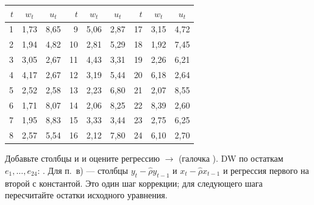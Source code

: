 \begin{center}
\small
\begin{tabular}{rcc @{\qquad} rcc @{\qquad} rcc}
\toprule
$t$ & $w_t$ & $u_t$ & $t$ & $w_t$ & $u_t$ & $t$ & $w_t$ & $u_t$ \\
\midrule
1 & 1,73 & 8,65 &  9 & 5,06 & 2,87 & 17 & 3,15 & 4,72 \\
2 & 1,94 & 4,82 & 10 & 2,81 & 5,29 & 18 & 1,92 & 7,45 \\
3 & 3,05 & 2,67 & 11 & 4,43 & 3,31 & 19 & 2,26 & 6,21 \\
4 & 4,17 & 2,67 & 12 & 3,19 & 5,44 & 20 & 6,18 & 2,64 \\
5 & 2,52 & 2,58 & 13 & 2,23 & 6,80 & 21 & 2,07 & 8,55 \\
6 & 1,71 & 8,07 & 14 & 2,06 & 8,25 & 22 & 8,39 & 2,60 \\
7 & 1,95 & 8,83 & 15 & 3,33 & 3,44 & 23 & 2,75 & 6,25 \\
8 & 2,57 & 5,54 & 16 & 2,12 & 7,80 & 24 & 6,10 & 2,70 \\
\bottomrule
\end{tabular}
\end{center}

\begin{excel}
Добавьте столбцы  и  и оцените регрессию
 $\to$  (галочка ). DW по
остаткам $e_1, \dots, e_{24}$: .
Для п.~в) — столбцы $y_t - \widehat{\rho}y_{t-1}$ и
$x_t - \widehat{\rho}x_{t-1}$ и регрессия первого на второй с константой. Это один шаг коррекции; для следующего шага пересчитайте остатки исходного уравнения.
\end{excel}

